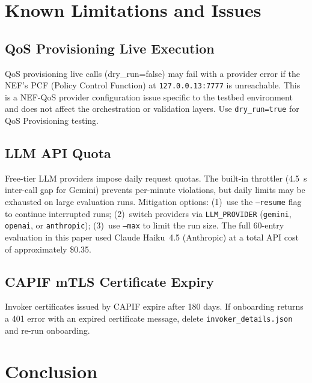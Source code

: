 \documentclass[conference]{IEEEtran}
\begin{document}
\section{Known Limitations and Issues}
\label{sec:limitations}

\subsection{QoS Provisioning Live Execution}

QoS provisioning live calls (dry\_run=false) may fail with a provider
error if the NEF's PCF (Policy Control Function) at \texttt{127.0.0.13:7777}
is unreachable. This is a NEF-QoS provider configuration issue specific to
the testbed environment and does not affect the orchestration or validation
layers. Use \texttt{dry\_run=true} for QoS Provisioning testing.

\subsection{LLM API Quota}

Free-tier LLM providers impose daily request quotas. The built-in throttler
(4.5~s inter-call gap for Gemini) prevents per-minute violations, but daily
limits may be exhausted on large evaluation runs. Mitigation options:
(1)~use the \texttt{--resume} flag to continue interrupted runs;
(2)~switch providers via \texttt{LLM\_PROVIDER} (\texttt{gemini},
\texttt{openai}, or \texttt{anthropic});
(3)~use \texttt{--max} to limit the run size.
The full 60-entry evaluation in this paper used Claude Haiku~4.5
(Anthropic) at a total API cost of approximately \$0.35.

\subsection{CAPIF mTLS Certificate Expiry}

Invoker certificates issued by CAPIF expire after 180 days. If onboarding
returns a 401 error with an expired certificate message, delete
\texttt{invoker\_details.json} and re-run onboarding.

\section{Conclusion}
\label{sec:conclusion}
\end{document}
